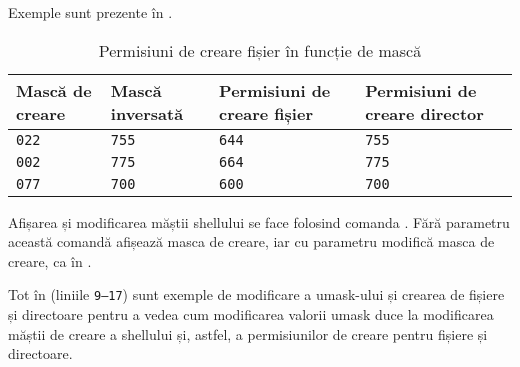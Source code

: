 Exemple sunt prezente în .

\begin{table}[!htb]
  \begin{center}
    \begin{tabular}{ p{} p{} p{} p{} }
      \toprule
              \textbf{Mască de creare} & \textbf{Mască inversată} & \textbf{Permisiuni de creare fișier} & \textbf{Permisiuni de creare director} \\
      \midrule
              \texttt{022} & \texttt{755} & \texttt{644} & \texttt{755} \\
      \midrule
              \texttt{002} & \texttt{775} & \texttt{664} & \texttt{775} \\
      \midrule
              \texttt{077} & \texttt{700} & \texttt{600} & \texttt{700} \\
      \bottomrule
    \end{tabular}
  \end{center}
  \caption{Permisiuni de creare fișier în funcție de mască}
  \label{table:user:umask}
\end{table}

Afișarea și modificarea măștii shellului se face folosind comanda . Fără
parametru această comandă afișează masca de creare, iar cu parametru modifică
masca de creare, ca în .


Tot în  (liniile \texttt{9--17}) sunt exemple de modificare a umask-ului și crearea de fișiere și
directoare pentru a vedea cum modificarea valorii umask duce la modificarea
măștii de creare a shellului și, astfel, a permisiunilor de creare pentru
fișiere și directoare.

